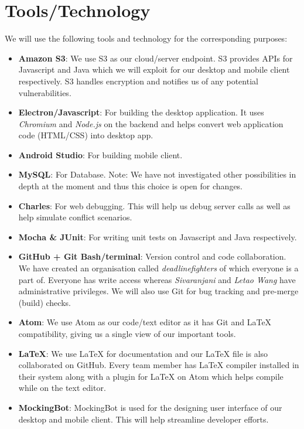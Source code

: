\section{Tools/Technology}
We will use the following tools and technology for the corresponding purposes:
\begin{itemize}

\item \textbf{Amazon S3}: We use S3 as our cloud/server endpoint. S3 provides APIs for Javascript and Java which we will exploit for our desktop and mobile client respectively. S3 handles encryption and notifies us of any potential vulnerabilities.

\item \textbf{Electron/Javascript}: For building the desktop application. It uses \emph{Chromium} and \emph{Node.js} on the backend and helps convert web application code (HTML/CSS) into desktop app.

\item \textbf{Android Studio}: For building mobile client.

\item \textbf{MySQL}: For Database. Note: We have not investigated other possibilities in depth at the moment and thus this choice is open for changes.

\item \textbf{Charles}: For web debugging. This will help us debug server calls as well as help simulate conflict scenarios.

\item \textbf{Mocha \& JUnit}: For writing unit tests on Javascript and Java respectively.

\item \textbf{GitHub + Git Bash/terminal}: Version control and code collaboration. We have created an organisation called \emph{deadlinefighters} of which everyone is a part of. Everyone has write access whereas \emph{Sivaranjani} and \emph{Letao Wang} have administrative privileges. We will also use Git for bug tracking and pre-merge (build) checks.

\item \textbf{Atom}: We use Atom as our code/text editor as it has Git and {\LaTeX} compatibility, giving us a single view of our important tools.

\item \textbf{{\LaTeX}}: We use {\LaTeX} for documentation and our {\LaTeX} file is also collaborated on GitHub. Every team member has {\LaTeX} compiler installed in their system along with a plugin for {\LaTeX} on Atom which helps compile while on the text editor.

\item \textbf{MockingBot}: MockingBot is used for the designing user interface of our desktop and mobile client. This will help streamline developer efforts.

\end{itemize}
